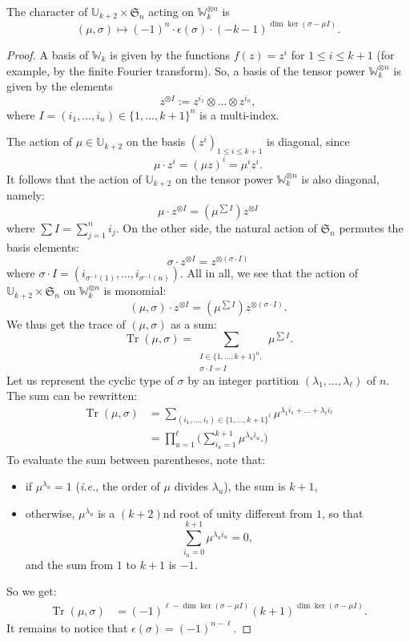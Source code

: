 \documentclass[10pt,a4paper]{amsart}
\newcommand{\bU}{\mathbb{U}}
\newcommand{\bW}{\mathbb{W}}
\begin{document}
\begin{prop} \label{prop:algparkessai}
    The character of $\bU_{k+2} \times \mathfrak{S}_n$ acting on $\bW_k^{\otimes n}$ is
    \[
        (\mu, \sigma)
            \mapsto
        (-1)^n \cdot \epsilon(\sigma) \cdot (-k-1)^{\dim\ker(\sigma-\mu I)}.
    \]
\end{prop}

\begin{proof}
A basis of $\bW_k$ is given by the functions $f(z) = z^i$ for $1\leq i \leq k+1$ (for example, by the finite Fourier transform).  So, a basis of the tensor power $\bW_k^{\otimes n}$ is given by the elements
\[
    z^{\otimes I} := z^{i_1} \otimes \dots \otimes z^{i_n},
\]
where $I = (i_1,\dots,i_n) \in \{1,\dots,k+1\}^n$ is a multi-index. 

The action of $\mu\in\bU_{k+2}$ on the basis $(z^i)_{1 \leq i \leq k+1}$ is diagonal, since
\[
    \mu \cdot z^i = (\mu z)^i = \mu^i z^i.
\]
It follows that the action of $\bU_{k+2}$ on the tensor power $\bW_k^{\otimes n}$ is also diagonal, namely:
\[
    \mu \cdot z^{\otimes I} 
        =
    (\mu^{\sum I}) z^{\otimes I}
\]
where $\sum I = \sum_{j=1}^n i_j$.  On the other side, the natural action of $\mathfrak{S}_n$ permutes the basis elements:
\[
    \sigma \cdot z^{\otimes I}
        =
    z^{\otimes (\sigma\cdot I)}
\]
where $\sigma \cdot I = (i_{\sigma^{-1}(1)}, \dots, i_{\sigma^{-1}(n)} )$.  All in all, we see that the action of $\bU_{k+2} \times \mathfrak{S}_n$ on $\bW_k^{\otimes n}$ is monomial:
\[
    (\mu,\sigma) \cdot z^{\otimes I}
        =
    (\mu^{\sum I}) z^{\otimes (\sigma\cdot I)}.
\]
We thus get the trace of $(\mu,\sigma)$ as a sum:
\[
    \operatorname{Tr}(\mu,\sigma)
        =
    \sum_{\substack{I \in \{1,\dots,k+1\}^n, \\ \sigma\cdot I = I}} \mu^{\sum I}.
\]
Let us represent the cyclic type of $\sigma$ by an integer partition $(\lambda_1,\dots,\lambda_\ell)$ of $n$.  The sum can be rewritten:
\begin{align*}
    \operatorname{Tr}(\mu,\sigma)
        &=
    \sum_{(i_1,\dots,i_\ell) \in \{1,\dots,k+1\}^\ell} \mu^{\lambda_1 i_1 + \dots + \lambda_\ell i_\ell} \\[2mm]
        &=
    \prod_{u=1}^\ell \bigg(
        \sum_{i_u = 1}^{k+1} \mu^{\lambda_u i_u}.
    \bigg)
\end{align*}
To evaluate the sum between parentheses, note that:
\begin{itemize}
    \item if $\mu^{\lambda_u} = 1$ ({\it i.e.}, the order of $\mu$ divides $\lambda_u$), the sum is $k+1$,
    \item otherwise, $\mu^{\lambda_u}$ is a $(k+2)$nd root of unity different from $1$, so that 
    \[
        \sum_{i_u = 0}^{k+1} \mu^{\lambda_u i_u}
            = 
        0,
    \]
    and the sum from $1$ to $k+1$ is $-1$.
\end{itemize}
So we get:
\begin{align*}
    \operatorname{Tr}(\mu,\sigma)
        &=
    (-1)^{\ell - \dim\ker(\sigma-\mu I)} (k+1)^{\dim\ker(\sigma-\mu I)}.
\end{align*}
It remains to notice that $\epsilon(\sigma) = (-1)^{n-\ell}$.
\end{proof}
\end{document}
